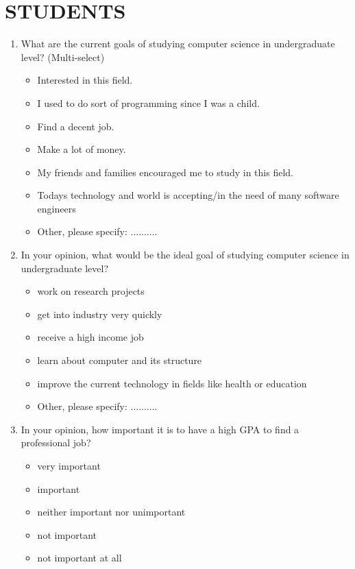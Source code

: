 \documentclass[12pt,a4paper,titlepage]{article}
\begin{document}
\section {STUDENTS}
\begin{enumerate}

	\item What are the current goals of studying computer science in undergraduate level? (Multi-select) 
	\begin{itemize}
		\item Interested in this field.
		\item I used to do sort of programming since I was a child.
		\item Find a decent job.
		\item Make a lot of money. 
		\item My friends and families encouraged me to study in this field.
		\item Todays technology and world is accepting/in the need of many software engineers
		\item Other, please specify: ..........
	\end{itemize}

	\item In your opinion, what would be the ideal goal of studying computer science in undergraduate level?
	\begin{itemize}
		\item work on research projects
		\item get into industry very quickly
		\item receive a high income job
		\item learn about computer and its structure
		\item improve the current technology in fields like health or education
		\item Other, please specify: ..........
	\end{itemize}

	\item In your opinion, how important it is to have a high GPA to find a professional job?
	\begin{itemize}
		\item very important
		\item important
		\item neither important nor unimportant
		\item not important
		\item not important at all
	\end{itemize}


\end{enumerate}
\end{document}

